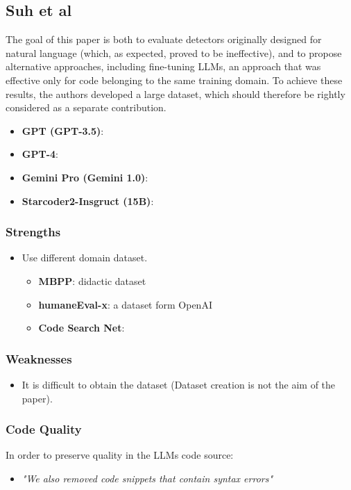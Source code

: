 \subsection{Suh et al}
The goal of this paper is both to evaluate detectors 
originally designed for natural language (which, as 
expected, proved to be ineffective), and to propose 
alternative approaches, including fine-tuning 
LLMs, an approach that was effective only for code 
belonging to the same training domain. To achieve 
these results, the authors developed a large dataset, 
which should therefore be rightly considered as a 
separate contribution.


\begin{itemize}
    \item \textbf{GPT (GPT-3.5)}: 
    \item \textbf{GPT-4}: 
    \item \textbf{Gemini Pro (Gemini 1.0)}: 
    \item \textbf{Starcoder2-Insgruct (15B)}: 
\end{itemize}


\subsubsection*{Strengths}
\begin{itemize}
    \item Use different domain dataset.
    \begin{itemize}
        \item \textbf{MBPP}: didactic dataset
        \item \textbf{humaneEval-x}: a dataset form OpenAI
        \item \textbf{Code Search Net}: 
    \end{itemize}
\end{itemize}


\subsubsection*{Weaknesses}
\begin{itemize}
    \item It is difficult to obtain the dataset
    (Dataset creation is not the aim of the paper).
\end{itemize}



\subsubsection*{Code Quality}
In order to preserve quality in the LLMs code source:
\begin{itemize}
    \item \textit{"We also removed code snippets that contain syntax errors"}
\end{itemize}


